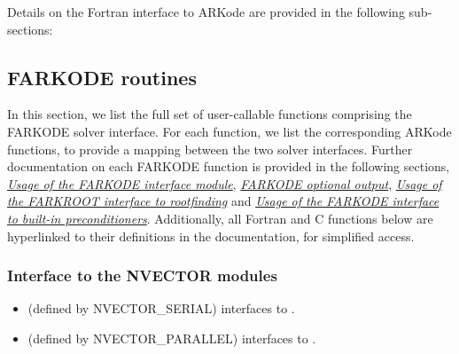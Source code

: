 \documentclass[letterpaper,10pt,english]{sphinxmanual}
\begin{document}
Details on the Fortran interface to ARKode are provided in the
following sub-sections:


\subsection{FARKODE routines}
\label{f_interface/Routines:finterface-routines}\label{f_interface/Routines::doc}\label{f_interface/Routines:farkode-routines}
In this section, we list the full set of user-callable functions
comprising the FARKODE solver interface.  For each function, we list
the corresponding ARKode functions, to provide a mapping between the
two solver interfaces.  Further documentation on each FARKODE function
is provided in the following sections, {\hyperref[f_interface/Usage:finterface-usage]{\emph{Usage of the FARKODE interface module}}},
{\hyperref[f_interface/Optional_output:finterface-optionaloutputs]{\emph{FARKODE optional output}}}, {\hyperref[f_interface/Rootfinding:finterface-rootfinding]{\emph{Usage of the FARKROOT interface to rootfinding}}} and
{\hyperref[f_interface/Preconditioning:finterface-preconditioning]{\emph{Usage of the FARKODE interface to built-in preconditioners}}}.  Additionally, all Fortran and C
functions below are hyperlinked to their definitions in the
documentation, for simplified access.


\subsubsection{Interface to the NVECTOR modules}
\label{f_interface/Routines:interface-to-the-nvector-modules}\begin{itemize}
\item {} 
{\hyperref[f_interface/Usage:f/_/FNVINITS]{}} (defined by NVECTOR\_SERIAL) interfaces to
{\hyperref[nvectors/NVector_Serial:N_VNewEmpty_Serial]{}}.

\item {} 
{\hyperref[f_interface/Usage:f/_/FNVINITP]{}} (defined by NVECTOR\_PARALLEL) interfaces to
{\hyperref[nvectors/NVector_Parallel:N_VNewEmpty_Parallel]{}}.

\end{itemize}
\end{document}
